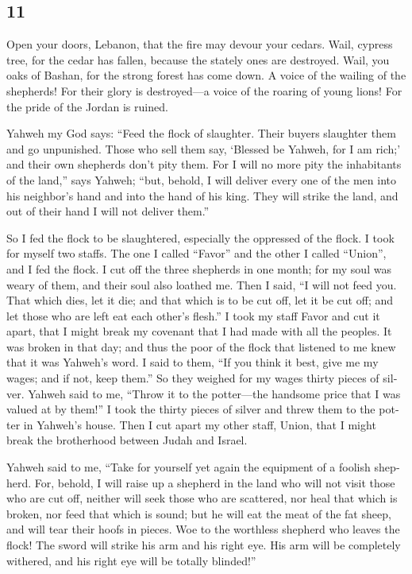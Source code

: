 \begin{paracol}{2}
\begin{otherlanguage}{english}
{\section{11}\label{section-21}}

 Open your doors, Lebanon, that the fire may devour your
cedars.  Wail, cypress tree, for the cedar has fallen,
because the stately ones are destroyed. Wail, you oaks of Bashan, for
the strong forest has come down.  A voice of the wailing
of the shepherds! For their glory is destroyed---a voice of the roaring
of young lions! For the pride of the Jordan is ruined.

 Yahweh my God says: ``Feed the flock of slaughter.
 Their buyers slaughter them and go unpunished. Those who
sell them say, `Blessed be Yahweh, for I am rich;' and their own
shepherds don't pity them.  For I will no more pity the
inhabitants of the land,'' says Yahweh; ``but, behold, I will deliver
every one of the men into his neighbor's hand and into the hand of his
king. They will strike the land, and out of their hand I will not
deliver them.''

 So I fed the flock to be slaughtered, especially the
oppressed of the flock. I took for myself two staffs. The one I called
``Favor'' and the other I called ``Union'', and I fed the flock.
 I cut off the three shepherds in one month; for my soul
was weary of them, and their soul also loathed me.  Then I
said, ``I will not feed you. That which dies, let it die; and that which
is to be cut off, let it be cut off; and let those who are left eat each
other's flesh.''  I took my staff Favor and cut it apart,
that I might break my covenant that I had made with all the peoples.
 It was broken in that day; and thus the poor of the
flock that listened to me knew that it was Yahweh's word.
 I said to them, ``If you think it best, give me my
wages; and if not, keep them.'' So they weighed for my wages thirty
pieces of silver.  Yahweh said to me, ``Throw it to the
potter---the handsome price that I was valued at by them!'' I took the
thirty pieces of silver and threw them to the potter in Yahweh's house.
 Then I cut apart my other staff, Union, that I might
break the brotherhood between Judah and Israel.

 Yahweh said to me, ``Take for yourself yet again the
equipment of a foolish shepherd.  For, behold, I will
raise up a shepherd in the land who will not visit those who are cut
off, neither will seek those who are scattered, nor heal that which is
broken, nor feed that which is sound; but he will eat the meat of the
fat sheep, and will tear their hoofs in pieces.  Woe to
the worthless shepherd who leaves the flock! The sword will strike his
arm and his right eye. His arm will be completely withered, and his
right eye will be totally blinded!''


\end{otherlanguage}
\end{paracol}
